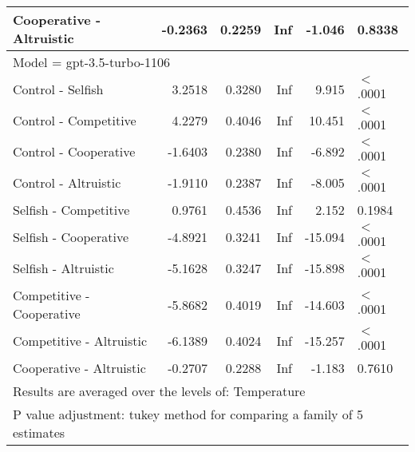 \begin{table}[ht]
\begin{tabular}{lrrrrl}
  Cooperative - Altruistic & -0.2363 & 0.2259 & Inf & -1.046 & 0.8338 \\ 
   \hline
\multicolumn{6}{l}{Model = gpt-3.5-turbo-1106}\\
Control - Selfish & 3.2518 & 0.3280 & Inf & 9.915 & $<$.0001 \\ 
  Control - Competitive & 4.2279 & 0.4046 & Inf & 10.451 & $<$.0001 \\ 
  Control - Cooperative & -1.6403 & 0.2380 & Inf & -6.892 & $<$.0001 \\ 
  Control - Altruistic & -1.9110 & 0.2387 & Inf & -8.005 & $<$.0001 \\ 
  Selfish - Competitive & 0.9761 & 0.4536 & Inf & 2.152 & 0.1984 \\ 
  Selfish - Cooperative & -4.8921 & 0.3241 & Inf & -15.094 & $<$.0001 \\ 
  Selfish - Altruistic & -5.1628 & 0.3247 & Inf & -15.898 & $<$.0001 \\ 
  Competitive - Cooperative & -5.8682 & 0.4019 & Inf & -14.603 & $<$.0001 \\ 
  Competitive - Altruistic & -6.1389 & 0.4024 & Inf & -15.257 & $<$.0001 \\ 
  Cooperative - Altruistic & -0.2707 & 0.2288 & Inf & -1.183 & 0.7610 \\ 
   \hline
\multicolumn{6}{l}{{\footnotesize Results are averaged over the levels of: Temperature}}\\

\multicolumn{6}{l}{{\footnotesize P value adjustment: tukey method for comparing a family of 5 estimates}}\\
\end{tabular}
\end{table}
